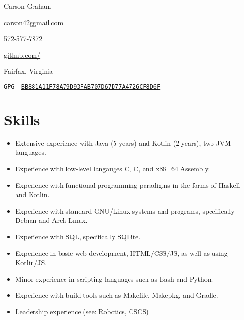 \documentclass[10pt,letterpaper]{article}
\makeatletter
\def\link#1#2{\color{blue!60!black}\href{#1}{#2}\color{black}}
\newcommand{\CPP}
{C\nolinebreak[4]\hspace{-.05em}\raisebox{.35ex}{\footnotesize\bf ++}}
\newcommand{\email}
{carson42g\raisebox{-0.2ex}{@}gmail.com}
\newcommand{\github}
{github.com\hspace{-0.007em}/\hspace{-0.05em}{mee42}}
\def\code#1{\texttt{#1}}
\makeatother
\begin{document}
    \thispagestyle{empty}
    \begin{center}
        \huge Carson Graham
    \end{center}

    \begin{adjustwidth}{0em}{0em}
        \begin{multicols}{4}
            \begin{center}
                \link{mailto:carson42g@gmail.com}{\email}
            \end{center}
            \columnbreak
            \begin{center}
                572-577-7872
            \end{center}
            \columnbreak
            \begin{center}
                \link{https://github.com/mee42/}{\github}
            \end{center}
            \columnbreak
            \begin{center}
                Fairfax, Virginia
            \end{center}
        \end{multicols}
    \end{adjustwidth}
    \vspace{-1em}
    \begin{center}
        \code{GPG: \link{https://keys.openpgp.org/search?q=BB881A11F78A79D93FAB707D67D77A4726CF8D6F}{BB881A11F78A79D93FAB707D67D77A4726CF8D6F}}
     \end{center}

        

    \section*{Skills}

    \begin{itemize}
        \item Extensive experience with Java (5 years) and Kotlin (2 years), two JVM languages.
        \item Experience with low-level langauges C, \CPP, and x86\_64 Assembly.
        \item Experience with functional programming paradigms in the forms of Haskell and Kotlin.
        \item Experience with standard GNU/Linux systems and programs, specifically Debian and Arch Linux.
        \item Experience with SQL, specifically SQLite.
        \item Experience in basic web development, HTML/CSS/JS, as well as using Kotlin/JS.
        \item Minor experience in scripting languages such as Bash and Python.
        \item Experience with build tools such as Makefile, Makepkg, and Gradle.
        \item Leadership experience (see: Robotics, CSCS)
    \end{itemize}
\end{document}
